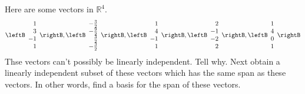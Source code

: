 \begin{enumialphparenastyle}
\begin{ex} Here are some vectors in $\mathbb{R}^{4}$. 
\begin{equation*}
\leftB 
\begin{array}{r}
1 \\ 
3 \\ 
-1 \\ 
1
\end{array}
\rightB ,\leftB 
\begin{array}{r}
-\frac{3}{2} \\ 
-\frac{9}{2} \\ 
\frac{3}{2} \\ 
-\frac{3}{2}
\end{array}
\rightB ,\leftB 
\begin{array}{r}
1 \\ 
4 \\ 
-1 \\ 
1
\end{array}
\rightB ,\leftB 
\begin{array}{r}
2 \\ 
-1 \\ 
-2 \\ 
2
\end{array}
\rightB ,\leftB 
\begin{array}{r}
1 \\ 
4 \\ 
0 \\ 
1
\end{array}
\rightB
\end{equation*}
Thse vectors can't possibly be linearly independent. Tell why. Next obtain a
linearly independent subset of these vectors which has the same span as
these vectors. In other words, find a basis for the span of these vectors.
\end{ex}



\end{enumialphparenastyle}
